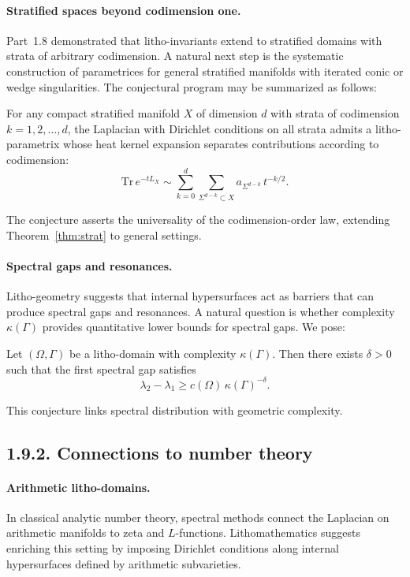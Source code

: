 \paragraph{Stratified spaces beyond codimension one.}
Part~1.8 demonstrated that litho-invariants extend to stratified domains
with strata of arbitrary codimension.
A natural next step is the systematic construction of parametrices
for general stratified manifolds with iterated conic or wedge singularities.
The conjectural program may be summarized as follows:

\begin{conjecture}\label{conj:param}
For any compact stratified manifold $X$ of dimension $d$
with strata of codimension $k=1,2,\dots,d$,
the Laplacian with Dirichlet conditions on all strata admits
a litho-parametrix whose heat kernel expansion separates
contributions according to codimension:
\[
\mathrm{Tr}\,e^{-tL_X} \sim \sum_{k=0}^d \sum_{\Sigma^{d-k}\subset X} a_{\Sigma^{d-k}}\, t^{-k/2}.
\]
\end{conjecture}

The conjecture asserts the universality of the codimension-order law,
extending Theorem~\ref{thm:strat} to general settings.

\paragraph{Spectral gaps and resonances.}
Litho-geometry suggests that internal hypersurfaces act as barriers
that can produce spectral gaps and resonances.
A natural question is whether complexity $\kappa(\Gamma)$
provides quantitative lower bounds for spectral gaps.
We pose:

\begin{conjecture}\label{conj:gap}
Let $(\Omega,\Gamma)$ be a litho-domain with complexity $\kappa(\Gamma)$.
Then there exists $\delta>0$ such that the first spectral gap satisfies
\[
\lambda_2-\lambda_1 \ge c(\Omega)\,\kappa(\Gamma)^{-\delta}.
\]
\end{conjecture}

This conjecture links spectral distribution with geometric complexity.

\subsection*{1.9.2. Connections to number theory}

\paragraph{Arithmetic litho-domains.}
In classical analytic number theory,
spectral methods connect the Laplacian on arithmetic manifolds
to zeta and $L$-functions.
Lithomathematics suggests enriching this setting
by imposing Dirichlet conditions along internal hypersurfaces
defined by arithmetic subvarieties.

